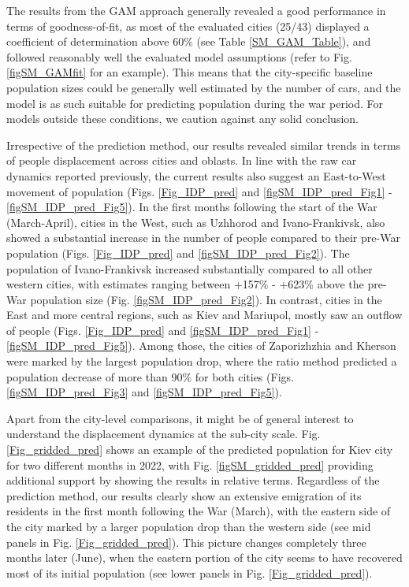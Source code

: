 \documentclass[sn-basic]{sn-jnl}%
\begin{document}
The results from the GAM approach generally revealed a good performance in terms of goodness-of-fit, as most of the evaluated cities (25/43) displayed a coefficient of determination above 60\% (see Table \ref{SM_GAM_Table}), and followed reasonably well the evaluated model assumptions (refer to Fig. \ref{figSM_GAMfit} for an example). This means that the city-specific baseline population sizes could be generally well estimated by the number of cars, and the model is as such suitable for predicting population during the war period. For models outside these conditions, we caution against any solid conclusion. %

Irrespective of the prediction method, our results revealed similar trends in terms of people displacement across cities and oblasts. In line with the raw car dynamics reported previously, the current results also suggest an East-to-West movement of population (Figs. \ref{Fig_IDP_pred} and \ref{figSM_IDP_pred_Fig1} - \ref{figSM_IDP_pred_Fig5}). In the first months following the start of the War (March-April), cities in the West, such as Uzhhorod and Ivano-Frankivsk, also showed a substantial increase in the number of people compared to their pre-War population (Figs. \ref{Fig_IDP_pred} and \ref{figSM_IDP_pred_Fig2}). The population of Ivano-Frankivsk increased substantially compared to all other western cities, with estimates ranging between +157\% - +623\% above the pre-War population size (Fig. \ref{figSM_IDP_pred_Fig2}). In contrast, cities in the East and more central regions, such as Kiev and Mariupol, mostly saw an outflow of people (Figs. \ref{Fig_IDP_pred} and \ref{figSM_IDP_pred_Fig1} - \ref{figSM_IDP_pred_Fig5}). Among those, the cities of Zaporizhzhia and Kherson were marked by the largest population drop, where the ratio method predicted a population decrease of more than 90\% for both cities (Figs. \ref{figSM_IDP_pred_Fig3} and \ref{figSM_IDP_pred_Fig5}). 

Apart from the city-level comparisons, it might be of general interest to understand the displacement dynamics at the sub-city scale. Fig. \ref{Fig_gridded_pred} shows an example of the predicted population for Kiev city for two different months in 2022, with Fig. \ref{figSM_gridded_pred} providing additional support by showing the results in relative terms. Regardless of the prediction method, our results clearly show an extensive emigration of its residents in the first month following the War (March), with the eastern side of the city marked by a larger population drop than the western side (see mid panels in Fig. \ref{Fig_gridded_pred}). This picture changes completely three months later (June), when the eastern portion of the city seems to have recovered most of its initial population (see lower panels in Fig. \ref{Fig_gridded_pred}).
\end{document}
